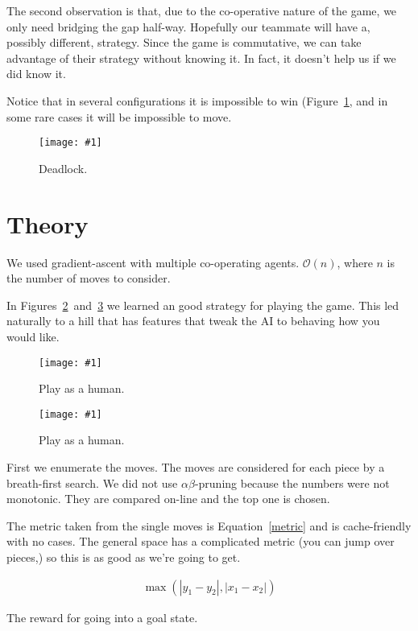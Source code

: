\documentclass[twocolumn]{article}
\def\fig#1#2{\begin{figure}[!ht]\begin{center}
\texttt{[image: \#1]}
\end{center}\caption{#2}\label{#1}\end{figure}}
\begin{document}
The second observation is that, due to the co-operative nature of the game, we only need bridging the gap half-way. Hopefully our teammate will have a, possibly different, strategy. Since the game is commutative, we can take advantage of their strategy without knowing it. In fact, it doesn't help us if we did know it.

Notice that in several configurations it is impossible to win (Figure~\ref{deadlock.jpg}, and in some rare cases it will be impossible to move.

\fig{deadlock.jpg}{Deadlock.}

\section{Theory}


We used gradient-ascent with multiple co-operating agents.\cite{chakraborty2008mb} $\mathcal{O}(n)$, where $n$ is the number of moves to consider.

In Figures~\ref{human1.jpg}~and~\ref{human2.jpg} we learned an good strategy for playing the game. This led naturally to a hill that has features that tweak the AI to behaving how you would like.

\fig{human1.jpg}{Play as a human.}

\fig{human2.jpg}{Play as a human.}

First we enumerate the moves. The moves are considered for each piece by a breath-first search. We did not use $\alpha\beta$-pruning because the numbers were not monotonic.\cite{knuth1976analysis} They are compared on-line and the top one is chosen.

The metric taken from the single moves is Equation~\ref{metric} and is cache-friendly with no cases. The general space has a complicated metric (you can jump over pieces,) so this is as good as we're going to get.

\begin{align}
\max{\left(|y_{1} - y_{2}|, |x_{1} - x_{2}|\right)}\label{metric}
\end{align}

The reward for going into a goal state.
\end{document}
